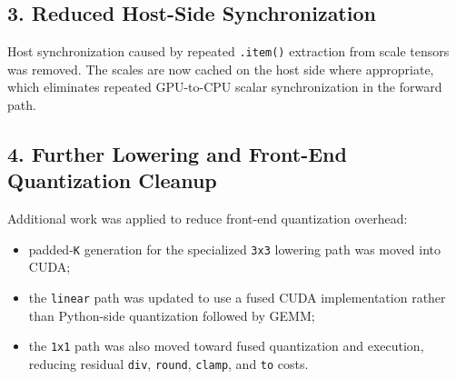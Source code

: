 \documentclass[11pt,a4paper]{article}
\begin{document}
\subsection{3. Reduced Host-Side Synchronization}
Host synchronization caused by repeated \texttt{.item()} extraction from scale tensors was removed. The scales are now cached on the host side where appropriate, which eliminates repeated GPU-to-CPU scalar synchronization in the forward path.

\subsection{4. Further Lowering and Front-End Quantization Cleanup}
Additional work was applied to reduce front-end quantization overhead:
\begin{itemize}
  \item padded-\texttt{K} generation for the specialized \texttt{3x3} lowering path was moved into CUDA;
  \item the \texttt{linear} path was updated to use a fused CUDA implementation rather than Python-side quantization followed by GEMM;
  \item the \texttt{1x1} path was also moved toward fused quantization and execution, reducing residual \texttt{div}, \texttt{round}, \texttt{clamp}, and \texttt{to} costs.
\end{itemize}
\end{document}

